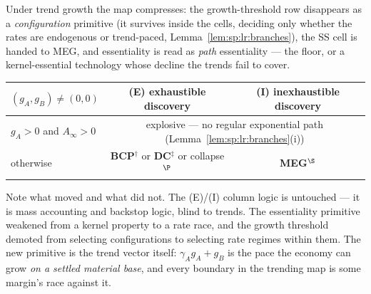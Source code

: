  Under trend growth the map compresses: the growth-threshold row
disappears as a \emph{configuration} primitive (it survives inside the cells, deciding only
whether the rates are endogenous or trend-paced, Lemma~\ref{lem:sp:lr:branches}), the SS cell
is handed to MEG, and essentiality is read as \emph{path} essentiality --- the floor, or a
kernel-essential technology whose decline the trends fail to cover.

\begin{center}
{\renewcommand{\arraystretch}{1.4}
\begin{tabular}{l|cc}
$\left(g_A,g_B\right)\ne\left(0,0\right)$ & (E) exhaustible discovery & (I) inexhaustible discovery \\
\hline
$g_A>0$ and $A_\infty>0$ & \multicolumn{2}{c}{explosive --- no regular exponential path (Lemma~\ref{lem:sp:lr:branches}(i))} \\
otherwise & \textbf{BCP}$^{\dagger}$ or \textbf{DC}$^{\ddagger}$ or collapse$^{\P}$ & \textbf{MEG}$^{\S}$ \\
\end{tabular}}
\end{center}


\medskip
Note what moved and what did not. The (E)/(I) column logic is untouched --- it is mass
accounting and backstop logic, blind to trends. The essentiality primitive weakened from a
kernel property to a rate race, and the growth threshold demoted from selecting
configurations to selecting rate regimes within them. The new primitive is the trend vector
itself: $\gamma_Ag_A+g_B$ is the pace the economy can grow \emph{on a settled material
base}, and every boundary in the trending map is some margin's race against it.

